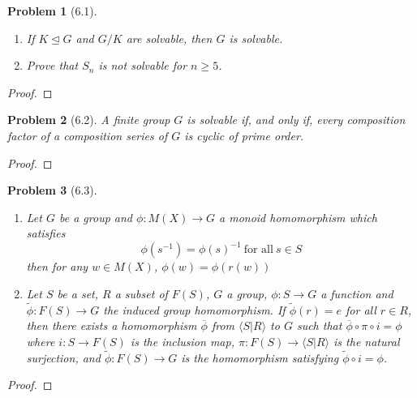 \documentclass[10pt]{article}
\newcommand{\sk}{\vskip 10mm}
\theoremstyle{plain}
\newtheorem{problem}{Problem}
\theoremstyle{remark}
\begin{document}
\begin{problem}[6.1]
  \begin{enumerate}
  \item If $K\trianglelefteq G$ and $G/K$ are solvable, then $G$ is solvable.
  \item Prove that $S_n$ is not solvable for $n\geq 5$.
  \end{enumerate}
\end{problem}

\begin{proof}
  
\end{proof}

\sk

\begin{problem}[6.2]
  A finite group $G$ is solvable if, and only if, every composition factor
  of a composition series of $G$ is cyclic of prime order.
\end{problem}

\begin{proof}
  
\end{proof}

\sk

\begin{problem}[6.3]
  \begin{enumerate}
  \item Let $G$ be a group and $\phi:M(X)\rightarrow G$ a monoid homomorphism which
    satisfies
    \[ \phi(s^{-1})=\phi(s)^{-1}\ \text{for all}\ s\in S \]
    then for any $w\in M(X)$, $\phi(w)=\phi(r(w))$
  \item Let $S$ be a set, $R$ a subset of $F(S)$, $G$ a group, $\phi:S\rightarrow G$
    a function and $\widetilde{\phi}:F(S)\rightarrow G$ the induced group homomorphism.
    If $\widetilde{\phi}(r)=e$ for all $r\in R$, then there exists a homomorphism
    $\overline{\phi}$ from $\langle S|R\rangle$ to $G$ such that $\overline{\phi}\circ\pi\circ i = \phi$ where
    $i:S\rightarrow F(S)$ is the inclusion map, $\pi:F(S)\rightarrow \langle S|R\rangle$ is the natural
    surjection, and $\widetilde{\phi}:F(S)\rightarrow G$ is the homomorphism
    satisfying $\widetilde{\phi}\circ i=\phi$.
  \end{enumerate}
\end{problem}

\begin{proof}
  
\end{proof}

\sk
\end{document}
